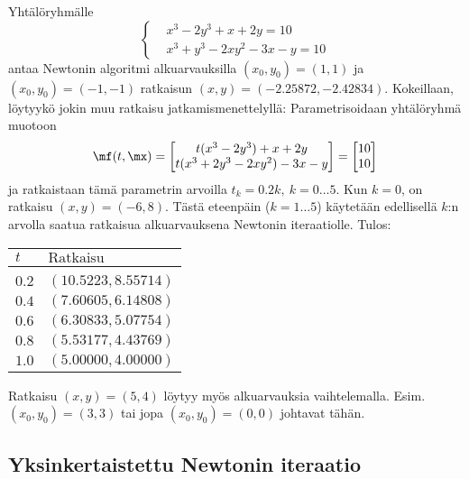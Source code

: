\begin{Exa} Yhtälöryhmälle %
\[
\left\{ \begin{aligned}
        &x^3-2y^3+x+2y=10 \\ &x^3+y^3-2xy^2-3x-y=10
        \end{aligned} \right.
\]
antaa Newtonin algoritmi alkuarvauksilla $(x_0,y_0)=(1,1)$ ja $(x_0,y_0)=(-1,-1)$ ratkaisun
$(x,y)=(-2.25872,-2.42834)$. Kokeillaan, löytyykö jokin muu ratkaisu jatkamismenettelyllä:
Parametrisoidaan yhtälöryhmä muotoon
\[
\mf(t,\mx) = \begin{bmatrix}
             t(x^3-2y^3)+x+2y \\ t(x^3+2y^3-2xy^2)-3x-y
             \end{bmatrix}
           = \begin{bmatrix} 10\\10 \end{bmatrix}
\]
ja ratkaistaan tämä parametrin arvoilla $t_k=0.2k,\ k=0 \ldots 5$. Kun $k=0$, on ratkaisu
$(x,y)=(-6,8)$. Tästä eteenpäin ($k=1 \ldots 5$) käytetään edellisellä $k$:n arvolla saatua
ratkaisua alkuarvauksena Newtonin iteraatiolle. Tulos:
\begin{center}
\begin{tabular}{ll}
$t$   & $\text{Ratkaisu}$  \\ \hline \\
$0.2$ & $(10.5223,8.55714)$ \\
$0.4$ & $(7.60605,6.14808)$ \\
$0.6$ & $(6.30833,5.07754)$ \\
$0.8$ & $(5.53177,4.43769)$ \\
$1.0$ & $(5.00000,4.00000)$
\end{tabular}
\end{center}
Ratkaisu $(x,y)=(5,4)$ löytyy myös alkuarvauksia vaihtelemalla. Esim.\ $(x_0,y_0)=(3,3)$ tai
jopa $(x_0,y_0)=(0,0)$ johtavat tähän. \loppu
\end{Exa}

\subsection{Yksinkertaistettu Newtonin iteraatio}
 
